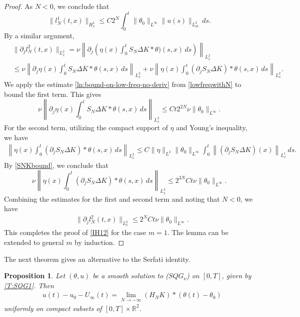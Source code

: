 \documentclass[11pt,reqno,xcolor=svgnames]{amsart}
\def\R{{\mathbb R}}
\theoremstyle{plain}
\newtheorem{prop}[theorem]{Proposition}
\theoremstyle{definition}
\theoremstyle{plain}
\theoremstyle{remark}
\begin{document}
\begin{proof}
As $N<0$, we conclude that 
$$\|l_N^1(t,x) \|_{H^1_x} \leq C2^{N}\int_0^t\| \theta_0\|_{L^{\infty}} \| u(s) \|_{L^2_{ul}}\, ds.$$ 
By a similar argument,
\begin{equation*}
\begin{split}
&\| \partial_j l_N^2(t,x) \|_{L^2_x} = \nu\left \|  \partial_j\left (\eta(x)\int_0^t S_{N}\Delta K \ast \theta)(s,x)  \, ds\right) \right \|_{L^2_x} \\
&\leq  \nu\left\|\partial_j\eta(x)\int_0^t S_{N}\Delta K \ast \theta (s,x)  \, ds \right\|_{L^2_x} + \nu\left\|\eta(x)\int_0^t (\partial_j S_{N}\Delta K) \ast \theta (s,x)  \, ds \right\|_{L^2_x}.
\end{split}
\end{equation*}
We apply the estimate \eqref{ln:bound-on-low-freq-no-deriv} from \cref{lowfreqwithN} to bound the first term.  This gives
$$\nu\left\|\partial_j\eta(x)\int_0^t S_{N}\Delta K \ast \theta (s,x)  \, ds \right\|_{L^2_x} \leq Ct2^{2N}\nu \|\theta_0\|_{L^{\infty}}.$$
For the second term, utilizing the compact support of $\eta$ and Young's inequality, we have
\begin{equation*}
\begin{split}
\left\|\eta(x)\int_0^t (\partial_j S_{N}\Delta K) \ast \theta (s,x)  \, ds \right\|_{L^2_x} \leq C\|\eta\|_{L^{2}}\|\theta_0\|_{L^{\infty}} \int_0^t\left\| (\partial_j S_{N}\Delta K) (x) \right\|_{L^{1}_x} \, ds.
\end{split}
\end{equation*}
By \cref{SNKbound},
we conclude that
\begin{equation}
   \nu\left\|\eta(x)\int_0^t (\partial_j S_{N}\Delta K) \ast \theta (s,x)  \, ds \right\|_{L^2_x} \leq 2^{3N}Ct\nu \|\theta_0\|_{L^{\infty}}.
\end{equation}
Combining the estimates for the first and second term and noting that $N<0$, we have
\begin{equation*}
\begin{split}
&\| \partial_j l_N^2(t,x) \|_{L^2_x} \leq 2^{N}Ct\nu \|\theta_0\|_{L^{\infty}}.
\end{split}
\end{equation*}
This completes the proof of \cref{IH12} for the case $m=1$.  The lemma can be extended to general $m$ by induction.
\end{proof}


The next theorem gives an alternative to the Serfati identity. 
\begin{prop}\label{renormalized2}
Let $(\theta,u)$ be a smooth solution to ($SQG_{\nu}$) on $[0,T]$, given by \cref{T:SQG1}.  Then 
\begin{equation}\label{highfreq0limit}
\begin{split}
&u(t) - u_0 -U_{\infty}(t) = \lim_{N\rightarrow -\infty} (H_NK) \ast (\theta(t) - \theta_0)
\end{split}
\end{equation}
uniformly on compact subsets of $[0,T]\times \R^2$.
\end{prop}
\end{document}
